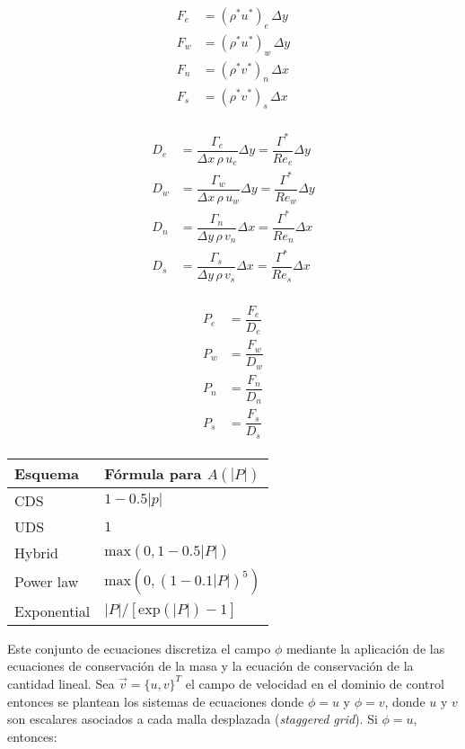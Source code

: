 \begin{align}
\begin{split}
F_e &= (\rho^* u^*)_e \, \Delta y \\
F_w &= (\rho^* u^*)_w \, \Delta y \\
F_n &= (\rho^* v^*)_n \, \Delta x \\
F_s &= (\rho^* v^*)_s \, \Delta x
\end{split}
\end{align}

\begin{align}
\begin{split}
D_e &= \dfrac{\Gamma_e}{\Delta x \, \rho \, u_e} \Delta y = \dfrac{\Gamma^*}{Re_e} \Delta y \\
D_w &= \dfrac{\Gamma_w}{\Delta x \, \rho \, u_w} \Delta y = \dfrac{\Gamma^*}{Re_w} \Delta y \\
D_n &= \dfrac{\Gamma_n}{\Delta y \, \rho \, v_n} \Delta x = \dfrac{\Gamma^*}{Re_n} \Delta x \\
D_s &= \dfrac{\Gamma_s}{\Delta y \, \rho \, v_s} \Delta x = \dfrac{\Gamma^*}{Re_s} \Delta x
\end{split}
\end{align}

\begin{align}
\begin{split}
P_e &= \dfrac{F_e}{D_e} \\
P_w &= \dfrac{F_w}{D_w} \\
P_n &= \dfrac{F_n}{D_n} \\
P_s &= \dfrac{F_s}{D_s}
\end{split}
\end{align}

\begin{table} [H]
\centering
\begin{tabular}{l|l}
Esquema & Fórmula para $A(|P|)$ \\ \hline \hline
CDS	&	$1-0.5|p|$	\\
UDS	&	$1$	\\
Hybrid	&	$\mbox{max}(0,1-0.5|P|)$	\\
Power law	&	$\mbox{max}(0,(1-0.1|P|)^5)$	\\
Exponential	&	$|P|/\left[ \mbox{exp}(|P|) -1 \right]$
\end{tabular}
\end{table}

Este conjunto de ecuaciones discretiza el campo $\phi$ mediante la aplicación de las ecuaciones de conservación de la masa y la ecuación de conservación de la cantidad lineal. Sea $\vec{v} = \{u,v\}^T$ el campo de velocidad en el dominio de control entonces se plantean los sistemas de ecuaciones donde $\phi=u$ y $\phi=v$, donde $u$ y $v$ son escalares asociados a cada malla desplazada (\textit{staggered grid}). Si $\phi = u$, entonces:

